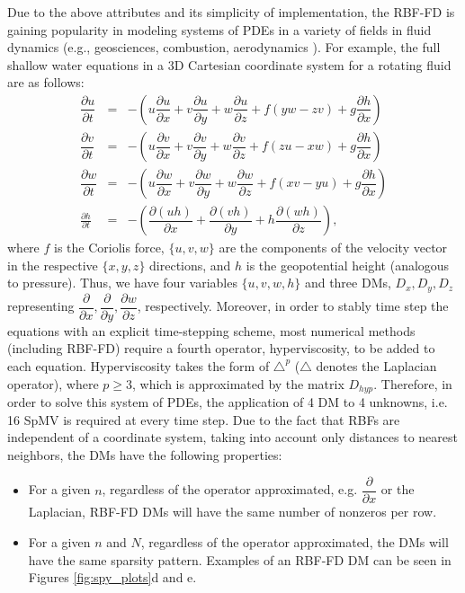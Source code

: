 Due to the above attributes and its simplicity of implementation, the RBF-FD is gaining popularity in modeling systems of PDEs in a variety of fields in fluid dynamics (e.g., geosciences, combustion, aerodynamics \cite{Bayona13,CDNT,FoL11,FLBWSC12,SPLM}). For example, the full shallow water equations in a 3D Cartesian coordinate system for a rotating fluid are as follows:
{
\small
\begin{eqnarray}
\dfrac{\partial u}{\partial t} &=& - \left( u\dfrac{\partial u}{\partial x} + v\dfrac{\partial u}{\partial y} + w\dfrac{\partial u}{\partial z} + f(yw - zv) + g\dfrac{\partial h}{\partial x} \right) 
\nonumber \\
\dfrac{\partial v}{\partial t} &=& - \left( u\dfrac{\partial v}{\partial x} + v\dfrac{\partial v}{\partial y} + w\dfrac{\partial v}{\partial z} + f(zu - xw) + g\dfrac{\partial h}{\partial x} \right)
\nonumber\\
\dfrac{\partial w}{\partial t} &=& - \left( u\dfrac{\partial w}{\partial x} + v\dfrac{\partial w}{\partial y} + w\dfrac{\partial w}{\partial z} + f(xv - yu) + g\dfrac{\partial h}{\partial x} \right)
\nonumber\\
\frac{\partial h}{\partial t}& =&-\left(\dfrac{\partial (uh)}{\partial x} + \dfrac{\partial (vh)}{\partial y} + h\dfrac{\partial (wh)}{\partial z}\right) , \label{height} \nonumber
\end{eqnarray}
} where $f$ is the Coriolis force, $\{u,v,w\}$ are the components of the velocity vector in the respective $\{x,y,z\}$ directions, and $h$ is the geopotential height (analogous to pressure). Thus, we have four variables $\{u,v,w,h\}$ and three DMs, $D_x, D_y, D_z$ representing $\dfrac{\partial}{\partial x}, \dfrac{\partial}{\partial y},\dfrac{\partial w}{\partial z}$, respectively. Moreover, in order to stably time step the equations with an explicit time-stepping scheme, most numerical methods (including RBF-FD) require a fourth operator, hyperviscosity, to be added to each equation. Hyperviscosity takes the form of $\triangle^p$ ($\triangle$ denotes the Laplacian operator), where $p\geq3$, which is approximated by the matrix $D_{hyp}$. Therefore, in order to solve this system of PDEs, the application of 4 DM to 4 unknowns, i.e. 16 SpMV is required at every time step. Due to the fact that RBFs are independent of a coordinate system, taking into account only distances to nearest neighbors, the DMs have the following properties:
\begin{itemize}
\item For a given $n$, regardless of the operator approximated, e.g. $\dfrac{\partial}{\partial x}$ or the Laplacian, RBF-FD DMs will have the same number of nonzeros per row.
\item For a given $n$ and $N$, regardless of the operator approximated, the DMs will have the same sparsity pattern. Examples of an RBF-FD DM can be seen in Figures \ref{fig:spy_plots}d and e.
\end{itemize}



